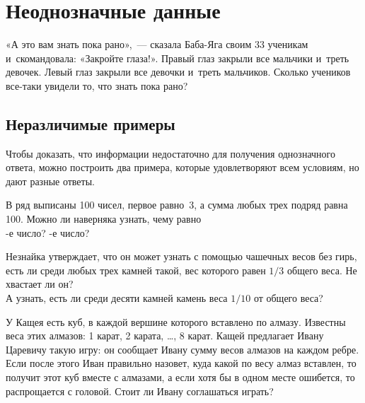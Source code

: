 
\section*{Неоднозначные данные}



\begin{flushright}
«А это вам знать пока рано»,~— сказала Баба-Яга своим 33 ученикам
и~скомандовала:
«Закройте глаза!».
Правый глаз закрыли все мальчики и~треть девочек.
Левый глаз закрыли все девочки и~треть мальчиков.
Сколько учеников все-таки увидели то, что знать пока рано?
\end{flushright}

\subsection*{Неразличимые примеры}

Чтобы доказать, что информации недостаточно для получения однозначного ответа,
можно построить два примера, которые удовлетворяют всем условиям, но дают
разные ответы.

\begin{problems}

\item
В ряд выписаны 100 чисел, первое равно~3, а сумма любых трех подряд равна 100.
Можно ли наверняка узнать, чему равно
\\
-е число?
\quad
{}-е число?

\item
\subproblem
Незнайка утверждает, что он может узнать с помощью чашечных весов без гирь,
есть ли среди любых трех камней такой, вес которого равен $1/3$ общего веса.
Не хвастает ли он?
\\
\subproblem
А узнать, есть ли среди десяти камней камень веса $1/10$ от общего веса?

\item
У Кащея есть куб, в каждой вершине которого вставлено по алмазу.
Известны веса этих алмазов: 1 карат, 2 карата, \ldots, 8 карат.
Кащей предлагает Ивану Царевичу такую игру: он сообщает Ивану сумму весов
алмазов на каждом ребре.
Если после этого Иван правильно назовет, куда какой по весу алмаз вставлен,
то получит этот куб вместе с алмазами, а если хотя бы в одном месте ошибется,
то распрощается с головой.
Стоит ли Ивану соглашаться играть?

\end{problems}

